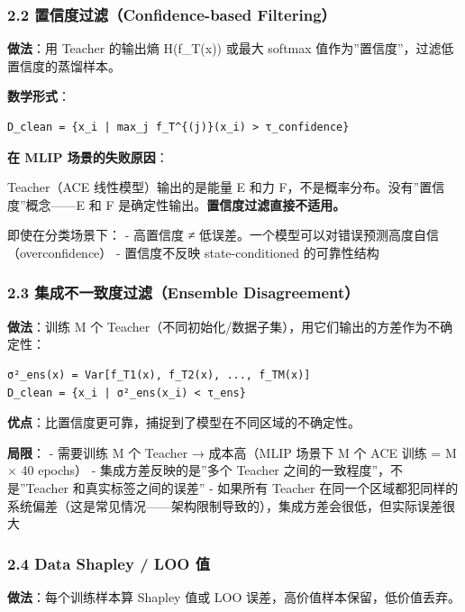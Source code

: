\documentclass[
  12pt,
]{ctexart}
\begin{document}
\subsubsection{2.2 置信度过滤（Confidence-based
Filtering）}\label{ux7f6eux4fe1ux5ea6ux8fc7ux6ee4confidence-based-filtering}

\textbf{做法}：用 Teacher 的输出熵 H(f\_T(x)) 或最大 softmax
值作为''置信度''，过滤低置信度的蒸馏样本。

\textbf{数学形式}：

\begin{verbatim}
D_clean = {x_i | max_j f_T^{(j)}(x_i) > τ_confidence}
\end{verbatim}

\textbf{在 MLIP 场景的失败原因}：

Teacher（ACE 线性模型）输出的是能量 E 和力
F，不是概率分布。没有''置信度''概念------E 和 F
是确定性输出。\textbf{置信度过滤直接不适用。}

即使在分类场景下： - 高置信度 ≠
低误差。一个模型可以对错误预测高度自信（overconfidence） - 置信度不反映
state-conditioned 的可靠性结构

\subsubsection{2.3 集成不一致度过滤（Ensemble
Disagreement）}\label{ux96c6ux6210ux4e0dux4e00ux81f4ux5ea6ux8fc7ux6ee4ensemble-disagreement}

\textbf{做法}：训练 M 个
Teacher（不同初始化/数据子集），用它们输出的方差作为不确定性：

\begin{verbatim}
σ²_ens(x) = Var[f_T1(x), f_T2(x), ..., f_TM(x)]
D_clean = {x_i | σ²_ens(x_i) < τ_ens}
\end{verbatim}

\textbf{优点}：比置信度更可靠，捕捉到了模型在不同区域的不确定性。

\textbf{局限}： - 需要训练 M 个 Teacher → 成本高（MLIP 场景下 M 个 ACE
训练 = M × 40 epochs） - 集成方差反映的是''多个 Teacher
之间的一致程度''，不是''Teacher 和真实标签之间的误差'' - 如果所有
Teacher
在同一个区域都犯同样的系统偏差（这是常见情况------架构限制导致的），集成方差会很低，但实际误差很大

\subsubsection{2.4 Data Shapley / LOO 值}\label{data-shapley-loo-ux503c}

\textbf{做法}：每个训练样本算 Shapley 值或 LOO
误差，高价值样本保留，低价值丢弃。
\end{document}
